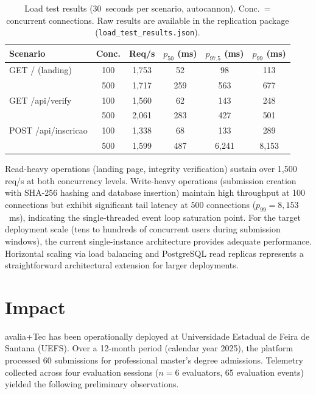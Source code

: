\documentclass[preprint,12pt,a4paper]{elsarticle}
\begin{document}
\begin{table}[H]
\centering
\footnotesize
\begin{tabular}{|l|c|c|c|c|c|}
\hline
\textbf{Scenario} & \textbf{Conc.} & \textbf{Req/s} & \textbf{$p_{50}$ (ms)} & \textbf{$p_{97.5}$ (ms)} & \textbf{$p_{99}$ (ms)} \\
\hline
GET / (landing) & 100 & 1{,}753 & 52 & 98 & 113 \\
 & 500 & 1{,}717 & 259 & 563 & 677 \\
\hline
GET /api/verify & 100 & 1{,}560 & 62 & 143 & 248 \\
 & 500 & 2{,}061 & 283 & 427 & 501 \\
\hline
POST /api/inscricao & 100 & 1{,}338 & 68 & 133 & 289 \\
 & 500 & 1{,}599 & 487 & 6{,}241 & 8{,}153 \\
\hline
\end{tabular}
\caption{Load test results (30~seconds per scenario, autocannon). Conc.\ = concurrent connections. Raw results are available in the replication package (\texttt{load\_test\_results.json}).}
\label{tab:loadtest}
\end{table}

Read-heavy operations (landing page, integrity verification) sustain over 1{,}500 req/s at both concurrency levels. Write-heavy operations (submission creation with SHA-256 hashing and database insertion) maintain high throughput at 100 connections but exhibit significant tail latency at 500 connections ($p_{99} = 8{,}153$~ms), indicating the single-threaded event loop saturation point. For the target deployment scale (tens to hundreds of concurrent users during submission windows), the current single-instance architecture provides adequate performance. Horizontal scaling via load balancing and PostgreSQL read replicas represents a straightforward architectural extension for larger deployments.

\section{Impact}

avalia+Tec has been operationally deployed at Universidade Estadual de Feira de Santana (UEFS). Over a 12-month period (calendar year 2025), the platform processed 60 submissions for professional master's degree admissions. Telemetry collected across four evaluation sessions ($n = 6$ evaluators, 65 evaluation events) yielded the following preliminary observations.
\end{document}
